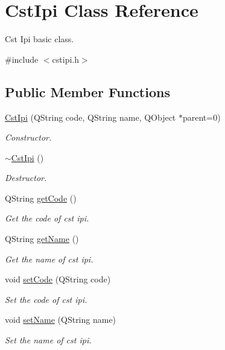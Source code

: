 \hypertarget{class_cst_ipi}{\section{\-Cst\-Ipi \-Class \-Reference}
\label{class_cst_ipi}
}


\-Cst \-Ipi basic class.  




{\ttfamily \#include $<$cstipi.\-h$>$}

\subsection*{\-Public \-Member \-Functions}
\begin{DoxyCompactItemize}
\item 
\hyperlink{class_cst_ipi_ab2ddc13f13ab421d7298d20e193a012b}{\-Cst\-Ipi} (\-Q\-String code, \-Q\-String name, \-Q\-Object $\ast$parent=0)
\begin{DoxyCompactList}\small\item\em \-Constructor. \end{DoxyCompactList}\item 
\hyperlink{class_cst_ipi_a9d22a1b424a246c645d51f5abadeab3a}{$\sim$\-Cst\-Ipi} ()
\begin{DoxyCompactList}\small\item\em \-Destructor. \end{DoxyCompactList}\item 
\-Q\-String \hyperlink{class_cst_ipi_a2ee51a7bb8e3ba164cffdfcf24860181}{get\-Code} ()
\begin{DoxyCompactList}\small\item\em \-Get the code of cst ipi. \end{DoxyCompactList}\item 
\-Q\-String \hyperlink{class_cst_ipi_a769f45824ca8523653645cf1ad66453a}{get\-Name} ()
\begin{DoxyCompactList}\small\item\em \-Get the name of cst ipi. \end{DoxyCompactList}\item 
void \hyperlink{class_cst_ipi_a4914b81014fd740725d03162b8f87486}{set\-Code} (\-Q\-String code)
\begin{DoxyCompactList}\small\item\em \-Set the code of cst ipi. \end{DoxyCompactList}\item 
void \hyperlink{class_cst_ipi_af3638044be863725c0ed037e657c9cdf}{set\-Name} (\-Q\-String name)
\begin{DoxyCompactList}\small\item\em \-Set the name of cst ipi. \end{DoxyCompactList}\end{DoxyCompactItemize}


